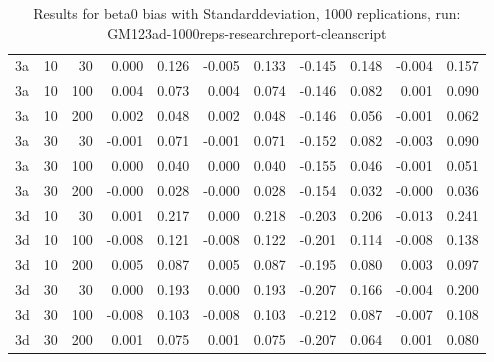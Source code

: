 \begin{table}[ht]
\begin{tabular}{lrrrrrrrrrr}
  3a & 10 & 30 & 0.000 & 0.126 & -0.005 & 0.133 & -0.145 & 0.148 & -0.004 & 0.157 \\ 
  3a & 10 & 100 & 0.004 & 0.073 & 0.004 & 0.074 & -0.146 & 0.082 & 0.001 & 0.090 \\ 
  3a & 10 & 200 & 0.002 & 0.048 & 0.002 & 0.048 & -0.146 & 0.056 & -0.001 & 0.062 \\ 
  3a & 30 & 30 & -0.001 & 0.071 & -0.001 & 0.071 & -0.152 & 0.082 & -0.003 & 0.090 \\ 
  3a & 30 & 100 & 0.000 & 0.040 & 0.000 & 0.040 & -0.155 & 0.046 & -0.001 & 0.051 \\ 
  3a & 30 & 200 & -0.000 & 0.028 & -0.000 & 0.028 & -0.154 & 0.032 & -0.000 & 0.036 \\ 
  3d & 10 & 30 & 0.001 & 0.217 & 0.000 & 0.218 & -0.203 & 0.206 & -0.013 & 0.241 \\ 
  3d & 10 & 100 & -0.008 & 0.121 & -0.008 & 0.122 & -0.201 & 0.114 & -0.008 & 0.138 \\ 
  3d & 10 & 200 & 0.005 & 0.087 & 0.005 & 0.087 & -0.195 & 0.080 & 0.003 & 0.097 \\ 
  3d & 30 & 30 & 0.000 & 0.193 & 0.000 & 0.193 & -0.207 & 0.166 & -0.004 & 0.200 \\ 
  3d & 30 & 100 & -0.008 & 0.103 & -0.008 & 0.103 & -0.212 & 0.087 & -0.007 & 0.108 \\ 
  3d & 30 & 200 & 0.001 & 0.075 & 0.001 & 0.075 & -0.207 & 0.064 & 0.001 & 0.080 \\ 
   \hline
\end{tabular}
\caption{Results for beta0 bias with Standarddeviation, 1000 replications, run: GM123ad-1000reps-researchreport-cleanscript} 
\label{tab:beta0_bias_sd}
\end{table}
